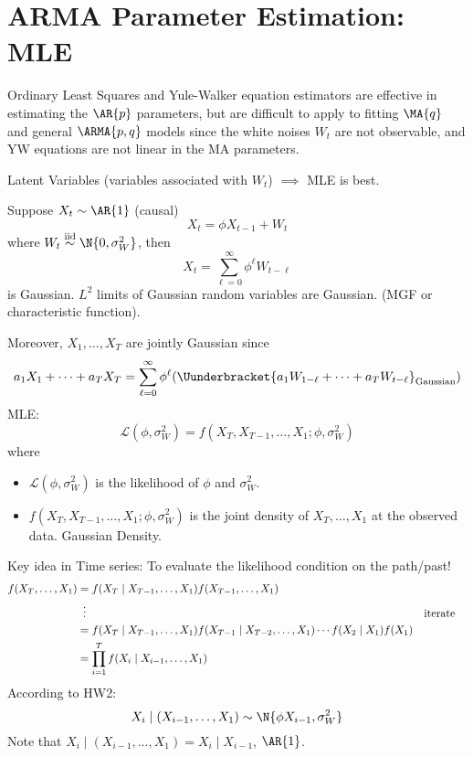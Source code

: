 \section{ARMA Parameter Estimation: MLE}
Ordinary Least Squares and Yule-Walker equation
estimators are effective in estimating the $ \AR{p} $
parameters, but are difficult to apply to fitting
$ \MA{q} $ and general $ \ARMA{p,q} $
models since the white noises $ W_t $ are not observable,
and YW equations are not linear in the MA parameters.

Latent Variables (variables associated with $ W_t $) $\implies$
MLE is best.

Suppose $ X_t \sim \AR{1} $ (causal)
\[ X_t=\phi X_{t-1}+W_t \]
where $ W_t \stackrel{\text{iid}}{\sim}\N{0,\sigma_W^2} $,
then
\[ X_t=\sum_{\ell=0}^{\infty} \phi^\ell W_{t-\ell} \]
is Gaussian. $ L^2 $ limits of Gaussian random variables are Gaussian.
(MGF or characteristic function).

Moreover, $ X_1,\ldots,X_T $ are jointly Gaussian since
\[ a_1X_1+\cdots+a_T X_T= \sum_{\ell=0}^{\infty}
    \phi^\ell (\Uunderbracket{a_1 W_{1-\ell}+\cdots+a_T W_{t-\ell}}_{\text{Gaussian}}) \]
MLE\@:
\[ \mathcal{L}(\phi,\sigma_W^2)=f(X_T, X_{T-1},\ldots,X_1;\phi,\sigma_W^2) \]
where
\begin{itemize}
    \item $\mathcal{L}(\phi,\sigma_W^2)$ is the likelihood of $ \phi $ and $ \sigma_W^2 $.
    \item $f(X_T, X_{T-1},\ldots,X_1;\phi,\sigma_W^2)$ is the joint density
          of $ X_T,\ldots,X_1 $ at the observed data. Gaussian Density.
\end{itemize}
Key idea in Time series: To evaluate the likelihood condition on
the path/past!
\begin{align*}
    f(X_T,\ldots,X_1)
     & =f(X_T\mid X_{T-1},\ldots,X_1)f(X_{T-1},\ldots,X_1)                                                            \\
     & \vdotswithin{=}                                                                            &  & \text{iterate} \\
     & =f(X_T\mid X_{T-1},\ldots,X_1)f(X_{T-1}\mid X_{T-2},\ldots,X_1)\cdots f(X_2\mid X_1)f(X_1)                     \\
     & =\prod_{i=1}^T f(X_i\mid X_{i-1},\ldots,X_1)
\end{align*}
According to HW2:
\[ X_i \mid (X_{i-1},\ldots,X_1)\sim \N{\phi X_{i-1},\sigma_W^2} \]
Note that $  X_i \mid (X_{i-1},\ldots,X_1)=X_i\mid X_{i-1} $, $ \AR{1} $.

